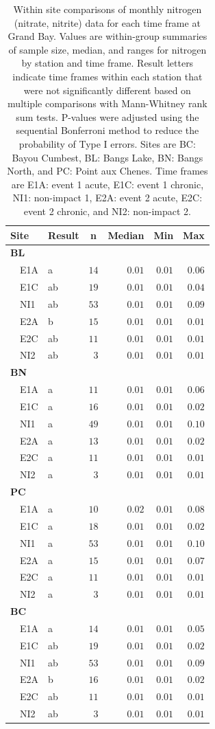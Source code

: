 \documentclass[letterpaper,12pt]{article}\usepackage[]{graphicx}\usepackage[]{color}
\begin{document}
\clearpage

\begin{table}[!tbp]
\caption{Within site comparisons  of monthly nitrogen (nitrate, nitrite) data for each time frame at Grand Bay.  Values are within-group summaries of sample size, median, and ranges for nitrogen by station and time frame.  Result letters indicate time frames within each station that were not significantly different based on multiple comparisons with Mann-Whitney rank sum tests.  P-values were adjusted using the sequential Bonferroni method to reduce the probability of Type I errors. Sites are BC: Bayou Cumbest, BL: Bangs Lake, BN: Bangs North, and PC: Point aux Chenes.  Time frames are E1A: event 1 acute, E1C: event 1 chronic, NI1: non-impact 1, E2A: event 2 acute, E2C: event 2 chronic, and NI2: non-impact 2.\label{tab:tntab}} 
\begin{center}
\begin{tabular}{llrrrr}
\hline\hline
\multicolumn{1}{l}{Site}&\multicolumn{1}{c}{Result}&\multicolumn{1}{c}{n}&\multicolumn{1}{c}{Median}&\multicolumn{1}{c}{Min}&\multicolumn{1}{c}{Max}\tabularnewline
\hline
{\bfseries BL}&&&&&\tabularnewline
~~E1A&a&$14$&$0.01$&$0.01$&$0.06$\tabularnewline
~~E1C&ab&$19$&$0.01$&$0.01$&$0.04$\tabularnewline
~~NI1&ab&$53$&$0.01$&$0.01$&$0.09$\tabularnewline
~~E2A&b&$15$&$0.01$&$0.01$&$0.01$\tabularnewline
~~E2C&ab&$11$&$0.01$&$0.01$&$0.01$\tabularnewline
~~NI2&ab&$ 3$&$0.01$&$0.01$&$0.01$\tabularnewline
\hline
{\bfseries BN}&&&&&\tabularnewline
~~E1A&a&$11$&$0.01$&$0.01$&$0.06$\tabularnewline
~~E1C&a&$16$&$0.01$&$0.01$&$0.02$\tabularnewline
~~NI1&a&$49$&$0.01$&$0.01$&$0.10$\tabularnewline
~~E2A&a&$13$&$0.01$&$0.01$&$0.02$\tabularnewline
~~E2C&a&$11$&$0.01$&$0.01$&$0.01$\tabularnewline
~~NI2&a&$ 3$&$0.01$&$0.01$&$0.01$\tabularnewline
\hline
{\bfseries PC}&&&&&\tabularnewline
~~E1A&a&$10$&$0.02$&$0.01$&$0.08$\tabularnewline
~~E1C&a&$18$&$0.01$&$0.01$&$0.02$\tabularnewline
~~NI1&a&$53$&$0.01$&$0.01$&$0.10$\tabularnewline
~~E2A&a&$15$&$0.01$&$0.01$&$0.07$\tabularnewline
~~E2C&a&$11$&$0.01$&$0.01$&$0.01$\tabularnewline
~~NI2&a&$ 3$&$0.01$&$0.01$&$0.01$\tabularnewline
\hline
{\bfseries BC}&&&&&\tabularnewline
~~E1A&a&$14$&$0.01$&$0.01$&$0.05$\tabularnewline
~~E1C&ab&$19$&$0.01$&$0.01$&$0.02$\tabularnewline
~~NI1&ab&$53$&$0.01$&$0.01$&$0.09$\tabularnewline
~~E2A&b&$16$&$0.01$&$0.01$&$0.02$\tabularnewline
~~E2C&ab&$11$&$0.01$&$0.01$&$0.01$\tabularnewline
~~NI2&ab&$ 3$&$0.01$&$0.01$&$0.01$\tabularnewline
\hline
\end{tabular}\end{center}
\end{table}
\end{document}
